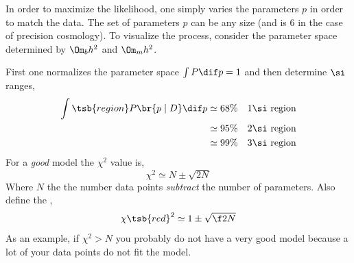 \documentclass{article}
\begin{document}
In order to maximize the likelihood, one simply varies the parameters $p$ in order to match the data. The set of parameters $p$ can be any size (and is $6$ in the case of precision cosmology). To visualize the process, consider the parameter space determined by $\Om_b h^2$ and $\Om_m h^2$.
\begin{center}
\end{center}
First one normalizes the parameter space $\int P\dif p = 1$ and then determine $\si$ ranges,
\begin{align*}
    \int\tsb{region} P\br{p \mid D} \dif p
    &\simeq 68\% \quad 1\si \text{ region} \\
    &\simeq 95\% \quad 2\si \text{ region} \\
    &\simeq 99\% \quad 3\si \text{ region} \\
\end{align*}
For a \textit{good} model the $\chi^2$ value is,
\[ \chi^2 \simeq N \pm \sqrt{2N} \]
Where $N$ the the number data points \textit{subtract} the number of parameters. Also define the ,
\[ \chi\tsb{red}^2 \simeq 1 \pm \sqrt{\f2N} \]
As an example, if $\chi^2 > N$ you probably do not have a very good model because a lot of your data points do not fit the model.
\end{document}
